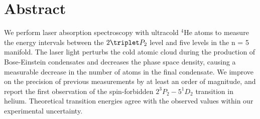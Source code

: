 






\section{Abstract}
We perform laser absorption spectroscopy with ultracold $^4$He atoms to measure the energy intervals between the $2\triplet P_2$ level and five levels in the n = 5 manifold. The laser light perturbs the cold atomic cloud during the production of Bose-Einstein condensates and decreases the phase space density, causing a measurable decrease in the number of atoms in the final condensate. We improve on the precision of previous measurements by at least an order of magnitude, and report the first observation of the spin-forbidden $2^{3\!}P_2 - 5^{1\!}D_2$ transition in helium. Theoretical transition energies agree with the observed values within our experimental uncertainty.



